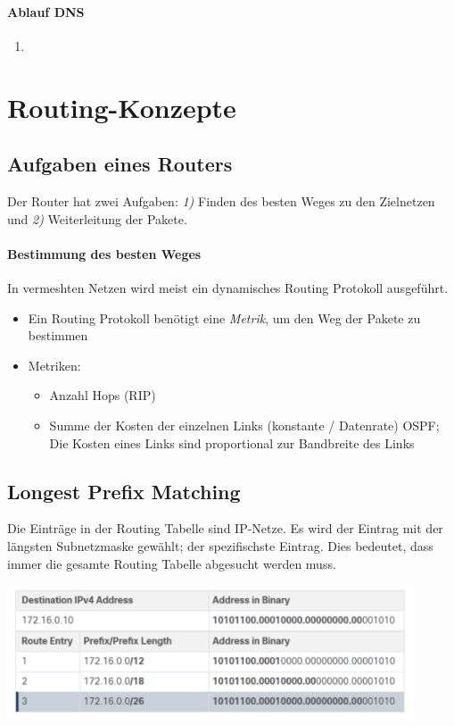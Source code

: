 \documentclass[a4paper,12pt]{article}
\begin{document}
\paragraph{Ablauf DNS}
\begin{enumerate}
\item
\end{enumerate}



\section{Routing-Konzepte}

\subsection{Aufgaben eines Routers}
Der Router hat zwei Aufgaben: \emph{1)} Finden des besten Weges zu den Zielnetzen und \emph{2)} Weiterleitung der Pakete.

\paragraph{Bestimmung des besten Weges} In vermeshten Netzen wird meist ein dynamisches Routing Protokoll ausgeführt.
\begin{itemize}
\item Ein Routing Protokoll benötigt eine \emph{Metrik}, um den Weg der Pakete zu bestimmen
\item Metriken:
  \begin{itemize}
  \item Anzahl Hops (RIP)
  \item Summe der Kosten der einzelnen Links (konstante / Datenrate) OSPF; Die Kosten  eines Links sind proportional zur Bandbreite des Links
  \end{itemize}
\end{itemize}

\subsection{Longest Prefix Matching}
Die Einträge in der Routing Tabelle sind IP-Netze. 
Es wird der Eintrag mit der längsten Subnetzmaske gewählt; der spezifischste Eintrag. Dies bedeutet, dass immer die gesamte Routing Tabelle abgesucht werden muss.


\begin{center}
\includegraphics[width=12cm]{img/11_lpm.png}
\end{center}
\end{document}

